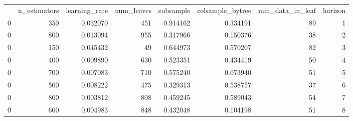 \begin{tabular}{lrrrrrrr}
 & n_estimators & learning_rate & num_leaves & subsample & colsample_bytree & min_data_in_leaf & horizon \\
0 & 350 & 0.032070 & 451 & 0.914162 & 0.334191 & 89 & 1 \\
0 & 800 & 0.013094 & 955 & 0.317966 & 0.150376 & 38 & 2 \\
0 & 150 & 0.045432 & 49 & 0.644973 & 0.570207 & 82 & 3 \\
0 & 400 & 0.009890 & 630 & 0.523351 & 0.434419 & 50 & 4 \\
0 & 700 & 0.007083 & 710 & 0.575240 & 0.073940 & 51 & 5 \\
0 & 500 & 0.008222 & 475 & 0.329313 & 0.538757 & 37 & 6 \\
0 & 800 & 0.003812 & 808 & 0.459245 & 0.589043 & 54 & 7 \\
0 & 600 & 0.004983 & 848 & 0.432048 & 0.104198 & 51 & 8 \\
\end{tabular}
